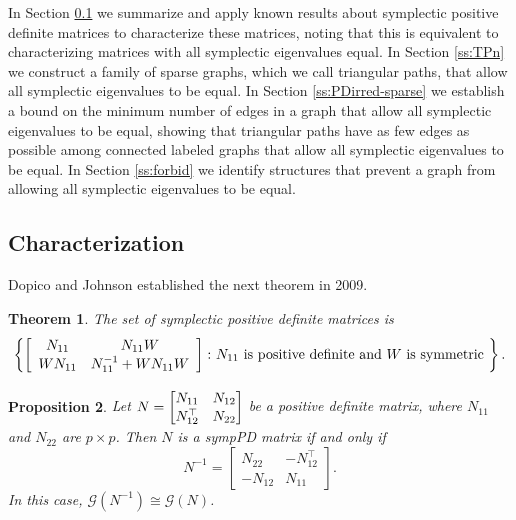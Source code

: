 \documentclass[12pt]{article}
\newtheorem{thm}{Theorem}[section]
\newtheorem{prop}[thm]{Proposition}
\theoremstyle{definition}
\theoremstyle{definition}
\theoremstyle{definition}
\numberwithin{figure}{section}
\numberwithin{equation}{section}
\newcommand{\G}{\mathcal{G}}
\newcommand{\trans}{^{\top}}
\newcommand{\mtx}[1]{\begin{bmatrix} #1 \end{bmatrix}}
\newcommand{\beq}{\begin{equation}}
\newcommand{\eeq}{\end{equation}}
\newcommand{\lsb}{\left\{}
\newcommand{\rsb}{\right\}}
\begin{document}
 In Section \ref{ss:sympPD-char} we summarize and apply  known results about symplectic positive definite matrices to characterize these matrices, {noting that} this is equivalent to {characterizing matrices with} all symplectic eigenvalues equal. In Section \ref{ss:TPn} we construct a family of 
 sparse graphs, which we call triangular paths, that allow all symplectic eigenvalues to be equal. In Section \ref{ss:PDirred-sparse} we establish a bound on  the minimum number of edges in a graph that allow all symplectic eigenvalues to be equal, showing that triangular paths have as few edges as possible among {connected} labeled graphs that allow all symplectic eigenvalues to be equal. In Section \ref{ss:forbid} we identify structures that prevent  a graph from allowing all symplectic eigenvalues to be equal.

\subsection{Characterization}\label{ss:sympPD-char}

Dopico and Johnson established the next theorem in 2009. \begin{thm}\label{t:DJ} {\rm \cite{Dopico-Johnson}} 
   The set of symplectic positive definite matrices is
\begin{equation}
\label{symppsd}
\renewcommand{\arraystretch}{1.1}
\lsb\left[ \begin{array}{cc} 
N_{11} & N_{11}W \\  
WN_{11} & N_{11}^{-1} + WN_{11}W
\end{array}
\right] 
 \colon N_{11} \mbox{ is positive definite and $W$ is symmetric }\rsb.  
\end{equation}
\end{thm}



\begin{prop}
\label{sympd}
Let 
$ 
N=
\renewcommand{\arraystretch}{1.1}
\mtx
{N_{11} & N_{12}\\ 
N_{12}\trans & N_{22} }$
be a positive definite matrix, 
where $N_{11}$ and $N_{22}$ are $p\times p$. 
Then $N$ is a sympPD matrix if and only if
\beq\label{eq:sympPDinv} N^{-1}= 
\left[ \begin{array}{rr} N_{22}& -N_{12}\trans \\ 
-N_{12} & N_{11} \end{array} \right]. \eeq
In this case, 
$\G(N^{-1})\cong \G(N)$. 


\end{prop}
\end{document}
